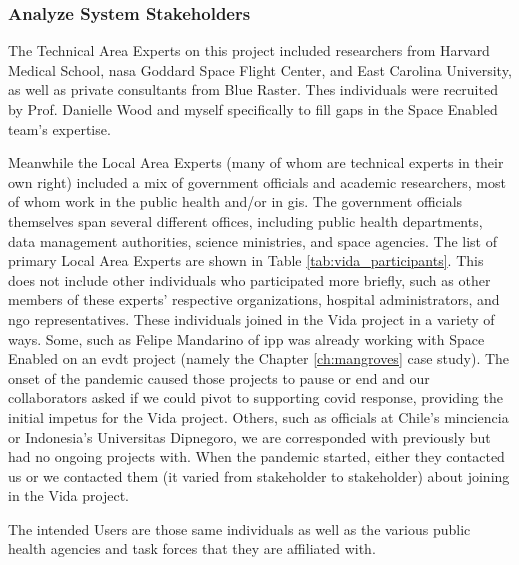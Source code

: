 

\subsubsection{Analyze System Stakeholders}

The Technical Area Experts on this project included researchers from Harvard Medical School, \ac{nasa} Goddard Space Flight Center, and East Carolina University, as well as private consultants from Blue Raster. Thes individuals were recruited by Prof. Danielle Wood and myself specifically to fill gaps in the Space Enabled team's expertise.

Meanwhile the Local Area Experts (many of whom are technical experts in their own right) included a mix of government officials and academic researchers, most of whom work in the public health and/or in \ac{gis}. The government officials themselves span several different offices, including public health departments, data management authorities, science ministries, and space agencies. The list of primary Local Area Experts are shown in Table \ref{tab:vida_participants}. This does not include other individuals who participated more briefly, such as other members of these experts' respective organizations, hospital administrators, and \ac{ngo} representatives. These individuals joined in the Vida project in a variety of ways. Some, such as Felipe Mandarino of \ac{ipp} was already working with Space Enabled on an \ac{evdt} project (namely the Chapter \ref{ch:mangroves} case study). The onset of the pandemic caused those projects to pause or end and our collaborators asked if we could pivot to supporting \ac{covid} response, providing the initial impetus for the Vida project. Others, such as officials at Chile's \ac{minciencia} or Indonesia's Universitas Dipnegoro, we are corresponded with previously but had no ongoing projects with. When the pandemic started, either they contacted us or we contacted them (it varied from stakeholder to stakeholder) about joining in the Vida project.

The intended Users are those same individuals as well as the various public health agencies and task forces that they are affiliated with.  

